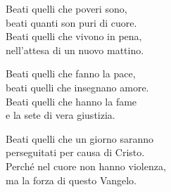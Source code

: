 
\strofa Beati quelli che poveri sono,\\
beati quanti son puri di cuore.\\
Beati quelli che vivono in pena,\\
nell'attesa di un nuovo mattino.

\spazio

 

\spazio

\strofa Beati quelli che fanno la pace,\\
beati quelli che insegnano amore.\\
Beati quelli che hanno la fame\\
e la sete di vera giustizia.

\spazio


\spazio

\strofa Beati quelli che un giorno saranno\\
perseguitati per causa di Cristo.\\
Perché nel cuore non hanno violenza,\\
ma la forza di questo Vangelo.

\spazio

